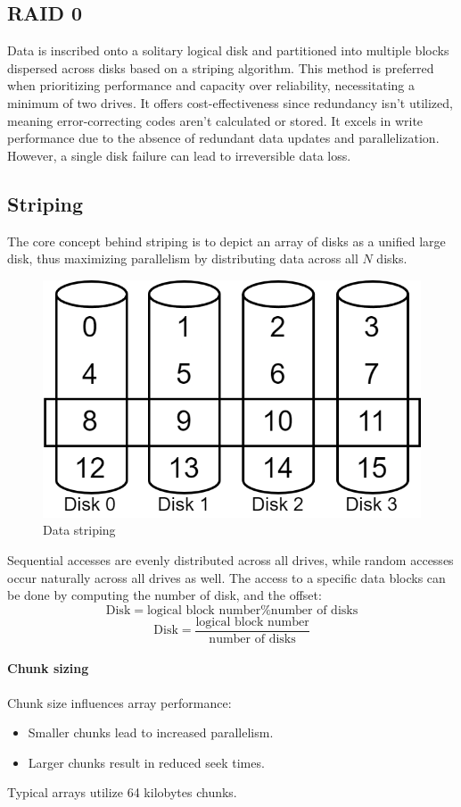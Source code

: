 \subsection{RAID 0}

Data is inscribed onto a solitary logical disk and partitioned into multiple blocks dispersed across disks based on a striping algorithm. 
This method is preferred when prioritizing performance and capacity over reliability, necessitating a minimum of two drives. 
It offers cost-effectiveness since redundancy isn't utilized, meaning error-correcting codes aren't calculated or stored. 
It excels in write performance due to the absence of redundant data updates and parallelization.
However, a single disk failure can lead to irreversible data loss.

\subsection{Striping}
The core concept behind striping is to depict an array of disks as a unified large disk, thus maximizing parallelism by distributing data across all $N$ disks.
\begin{figure}[H]
    \centering
    \includegraphics[width=0.4\linewidth]{images/strip.png}
    \caption{Data striping}
\end{figure}
Sequential accesses are evenly distributed across all drives, while random accesses occur naturally across all drives as well.
The access to a specific data blocks can be done by computing the number of disk, and the offset: 
\[\text{Disk}=\text{logical block number} \% \text{number of disks}\]
\[\text{Disk}=\dfrac{\text{logical block number}}{\text{number of disks}}\]

\paragraph*{Chunk sizing}
Chunk size influences array performance:
\begin{itemize}
    \item Smaller chunks lead to increased parallelism.
    \item Larger chunks result in reduced seek times.
\end{itemize}
Typical arrays utilize 64 kilobytes chunks.

